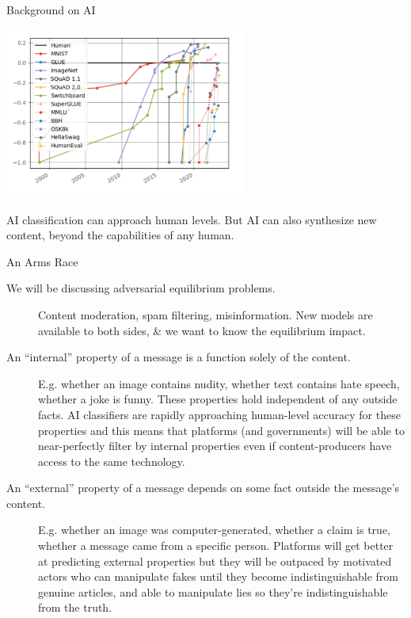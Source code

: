 \documentclass[
  10pt,
  ignorenonframetext,
]{beamer}
\providecommand{\tightlist}{%
  \setlength{\itemsep}{0pt}\setlength{\parskip}{0pt}}\usepackage{longtable,booktabs,array}
\begin{document}
\begin{frame}{Background on AI}
\label{background-on-ai}
\begin{description}
\tightlist
\item[AI is growing fast.]
\includegraphics[width=3.125in,height=\textheight]{images/2023-09-19-09-55-57.png}
\item[AI can classify, but it can also synthesize.]
AI classification can approach human levels. But AI can also synthesize
new content, beyond the capabilities of any human.
\end{description}
\end{frame}

\begin{frame}{An Arms Race}
\label{an-arms-race}
\begin{description}
\item[We will be discussing adversarial equilibrium problems.]
Content moderation, spam filtering, misinformation. New models are
available to both sides, \& we want to know the equilibrium impact.
\item[An ``internal'' property of a message is a function solely of the
content.]
E.g. whether an image contains nudity, whether text contains hate
speech, whether a joke is funny. These properties hold independent of
any outside facts. AI classifiers are rapidly approaching human-level
accuracy for these properties and this means that platforms (and
governments) will be able to near-perfectly filter by internal
properties even if content-producers have access to the same technology.
\item[An ``external'' property of a message depends on some fact outside
the message's content.]
E.g. whether an image was computer-generated, whether a claim is true,
whether a message came from a specific person. Platforms will get better
at predicting external properties but they will be outpaced by motivated
actors who can manipulate fakes until they become indistinguishable from
genuine articles, and able to manipulate lies so they're
indistinguishable from the truth.
\end{description}
\end{frame}
\end{document}
